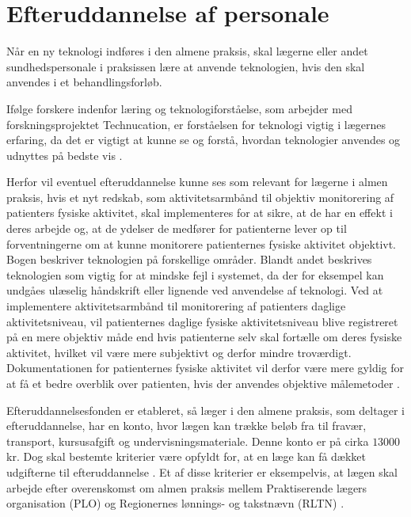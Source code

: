  
\section{Efteruddannelse af personale}
\label{sec:efteruddannelse}
Når en ny teknologi indføres i den almene praksis, skal lægerne eller andet sundhedspersonale i praksissen lære at anvende teknologien, hvis den skal anvendes i et behandlingsforløb. 

Ifølge forskere indenfor læring og teknologiforståelse, som arbejder med forskningsprojektet Technucation, er forståelsen for teknologi vigtig i lægernes erfaring, da det er vigtigt at kunne se og forstå, hvordan teknologier anvendes og udnyttes på bedste vis \citep{aarhusuniversitet2013}. 

Herfor vil eventuel efteruddannelse kunne ses som relevant for lægerne i almen praksis, hvis et nyt redskab, som aktivitetsarmbånd til objektiv monitorering af patienters fysiske aktivitet, skal implementeres for at sikre, at de har en effekt i deres arbejde og, at de ydelser de medfører for patienterne lever op til forventningerne om at kunne monitorere patienternes fysiske aktivitet objektivt. Bogen \cite{hasse2012} beskriver teknologien på forskellige områder. Blandt andet beskrives teknologien som vigtig for at mindske fejl i systemet, da der for eksempel kan undgåes ulæselig håndskrift eller lignende ved anvendelse af teknologi. Ved at implementere aktivitetsarmbånd til monitorering af patienters daglige aktivitetsniveau, vil patienternes daglige fysiske aktivitetsniveau blive registreret på en mere objektiv måde end hvis patienterne selv skal fortælle om deres fysiske aktivitet, hvilket vil være mere subjektivt og derfor mindre troværdigt. Dokumentationen for patienternes fysiske aktivitet vil derfor være mere gyldig for at få et bedre overblik over patienten, hvis der anvendes objektive målemetoder \citep{hasse2012}. 

Efteruddannelsesfonden er etableret, så læger i den almene praksis, som deltager i efteruddannelse, har en konto, hvor lægen kan trække beløb fra til fravær, transport, kursusafgift og undervisningsmateriale. Denne konto er på cirka $13000$ kr. Dog skal bestemte kriterier være opfyldt for, at en læge kan få dækket udgifterne til efteruddannelse \citep{vedsted2005}. Et af disse kriterier er eksempelvis, at lægen skal arbejde efter overenskomst om almen praksis mellem Praktiserende lægers organisation (PLO) og Regionernes lønnings- og takstnævn (RLTN) \citep{fondenforalmenpraksis2016}. 

